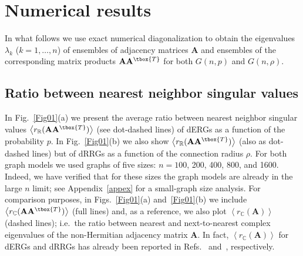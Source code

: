 \section{Numerical results}

In what follows we use exact numerical diagonalization to obtain the eigenvalues $\lambda_k$ 
($k =1,\ldots,n$) of ensembles of adjacency matrices $\mathbf{A}$ and ensembles of the corresponding 
matrix products $\mathbf{A}\mathbf{A}^{\tbox{T}}$ for both $G(n,p)$ and $G(n,\rho)$.

\subsection{Ratio between nearest neighbor singular values}

In Fig.~\ref{Fig01}(a) we present the average ratio between nearest neighbor singular values 
$\left\langle r_\mathbb{R}(\mathbf{A}\mathbf{A}^{\tbox{T}}) \right\rangle$ (see dot-dashed lines)
of dERGs as a function of the probability $p$.
In Fig.~\ref{Fig01}(b) we also show 
$\left\langle r_\mathbb{R}(\mathbf{A}\mathbf{A}^{\tbox{T}}) \right\rangle$ (also as dot-dashed lines)
but of dRRGs as a function of the connection radius $\rho$.
For both graph models we used graphs of five sizes: $n=100$, 200, 400, 800, and 1600.
Indeed, we have verified that for these sizes the graph models are already in the large $n$
limit; see Appendix~\ref{appex} for a small-graph size analysis. 
For comparison purposes, in Figs.~\ref{Fig01}(a) and~\ref{Fig01}(b) we include 
$\left\langle r_\mathbb{C}(\mathbf{A}\mathbf{A}^{\tbox{T}}) \right\rangle$ (full lines)
and, as a reference, we also plot $\left\langle r_\mathbb{C}(\mathbf{A}) \right\rangle$ 
(dashed lines); i.e.~the ratio between nearest and next-to-nearest complex eigenvalues 
of the non-Hermitian adjacency matrix $\mathbf{A}$.
In fact, $\left\langle r_\mathbb{C}(\mathbf{A}) \right\rangle$ for dERGs and dRRGs has already 
been reported in Refs.~\cite{PRRCM20} and~\cite{PM23}, respectively.


